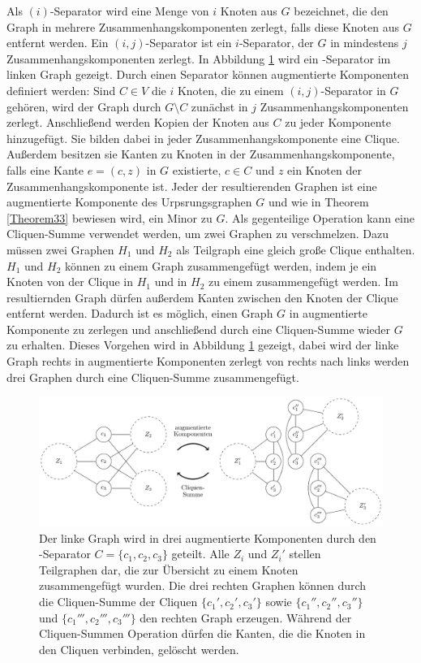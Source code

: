 Als $(i)$-Separator wird eine Menge von $i$ Knoten aus $G$ bezeichnet, die den Graph in mehrere Zusammenhangskomponenten zerlegt, falls diese Knoten aus $G$ entfernt werden.
Ein $(i, j)$-Separator ist ein $i$-Separator, der $G$ in mindestens $j$ Zusammenhangskomponenten zerlegt.
In Abbildung \ref{fig:AugmentierteKomponenten} wird ein \dd-Separator im linken Graph gezeigt.
Durch einen Separator können augmentierte Komponenten definiert werden:
Sind $C \in V$ die $i$ Knoten, die zu einem $(i, j)$-Separator in $G$ gehören, wird der Graph durch $G \setminus C$ zunächst in $j$ Zusammenhangskomponenten zerlegt.
Anschließend werden Kopien der Knoten aus $C$ zu jeder Komponente hinzugefügt.
Sie bilden dabei in jeder Zusammenhangskomponente eine Clique.
Außerdem besitzen sie Kanten zu Knoten in der Zusammenhangskomponente, falls eine Kante $e = (c, z)$ in $G$ existierte, $c \in C$ und $z$ ein Knoten der Zusammenhangskomponente ist.
Jeder der resultierenden Graphen ist eine augmentierte Komponente des Urpsrungsgraphen $G$ und wie in Theorem \ref{Theorem33} bewiesen wird, \evtl ein Minor zu $G$.
Als gegenteilige Operation kann eine Cliquen-Summe verwendet werden, um zwei Graphen zu verschmelzen.
Dazu müssen zwei Graphen $H_1$ und $H_2$ als Teilgraph eine gleich große Clique enthalten.
$H_1$ und $H_2$ können zu einem Graph zusammengefügt werden, indem je ein Knoten von der Clique in $H_1$ und in $H_2$ zu einem zusammengefügt werden.
Im resultiernden Graph dürfen außerdem Kanten zwischen den Knoten der Clique entfernt werden.
Dadurch ist es möglich, einen Graph $G$ in augmentierte Komponente zu zerlegen und anschließend durch eine Cliquen-Summe wieder $G$ zu erhalten.
Dieses Vorgehen wird in Abbildung \ref{fig:AugmentierteKomponenten} gezeigt, dabei wird der linke Graph rechts in augmentierte Komponenten zerlegt \bzw von rechts nach links werden drei Graphen durch eine Cliquen-Summe zusammengefügt.
\begin{figure}[H]
  \centering
  \includegraphics[keepaspectratio]{bilder/Augmentierte_Komponenten.pdf}
  \caption{Der linke Graph wird in drei augmentierte Komponenten durch den \dd-Separator $C = \{c_1, c_2, c_3\}$ geteilt.
           Alle $Z_i$ und $Z_i'$ stellen Teilgraphen dar, die zur Übersicht zu einem Knoten zusammengefügt wurden.
           Die drei rechten Graphen können durch die Cliquen-Summe der Cliquen $\{c_1', c_2', c_3'\}$ sowie $\{c_1'', c_2'', c_3''\}$ und $\{c_1''', c_2''', c_3'''\}$ den rechten Graph erzeugen.
           Während der Cliquen-Summen Operation dürfen die Kanten, die die Knoten in den Cliquen verbinden, gelöscht werden.}
  \label{fig:AugmentierteKomponenten}
\end{figure}
